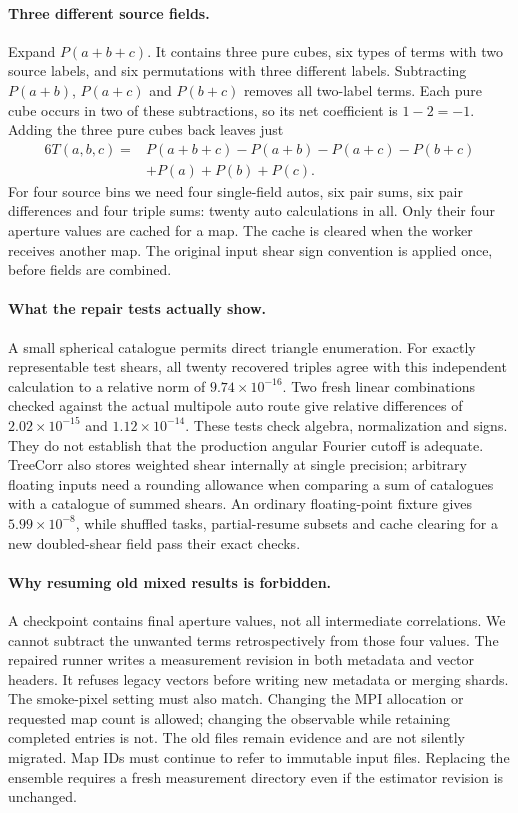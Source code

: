 \documentclass[11pt]{article}
\begin{document}
\paragraph{Three different source fields.}
Expand $P(a+b+c)$. It contains three pure cubes, six types of terms with
two source labels, and six permutations with three different labels.
Subtracting $P(a+b)$, $P(a+c)$ and $P(b+c)$ removes all two-label terms.
Each pure cube occurs in two of these subtractions, so its net coefficient
is $1-2=-1$. Adding the three pure cubes back leaves just
\begin{equation}
\begin{split}
 6T(a,b,c)={}&P(a+b+c)-P(a+b)-P(a+c)-P(b+c)\\
            &+P(a)+P(b)+P(c).
\end{split}
\end{equation}
For four source bins we need four single-field autos, six pair sums,
six pair differences and four triple sums: twenty auto calculations in
all. Only their four aperture values are cached for a map. The cache is
cleared when the worker receives another map. The original input shear
sign convention is applied once, before fields are combined.

\paragraph{What the repair tests actually show.}
A small spherical catalogue permits direct triangle enumeration. For
exactly representable test shears, all twenty recovered triples agree
with this independent calculation to a relative norm of
$9.74\times10^{-16}$. Two fresh linear combinations checked against the
actual multipole auto route give relative differences of
$2.02\times10^{-15}$ and $1.12\times10^{-14}$.
These tests check algebra, normalization and signs. They do not establish
that the production angular Fourier cutoff is adequate. TreeCorr also
stores weighted shear internally at single precision; arbitrary floating
inputs need a rounding allowance when comparing a sum of catalogues with
a catalogue of summed shears. An ordinary floating-point fixture gives
$5.99\times10^{-8}$, while shuffled tasks, partial-resume subsets and
cache clearing for a new doubled-shear field pass their exact checks.

\paragraph{Why resuming old mixed results is forbidden.}
A checkpoint contains final aperture values, not all intermediate
correlations. We cannot subtract the unwanted terms retrospectively from
those four values. The repaired runner writes a measurement revision in
both metadata and vector headers. It refuses legacy vectors before writing
new metadata or merging shards. The smoke-pixel setting must also match.
Changing the MPI allocation or requested map count is allowed; changing
the observable while retaining completed entries is not. The old files
remain evidence and are not silently migrated. Map IDs must continue to
refer to immutable input files. Replacing the ensemble requires a fresh
measurement directory even if the estimator revision is unchanged.
\end{document}
